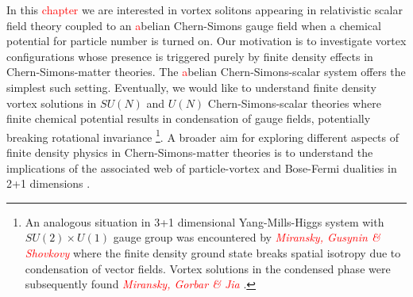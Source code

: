 In this \textcolor{red}{chapter} we are interested in vortex solitons appearing in  relativistic scalar field theory coupled to an \textcolor{red}{a}belian Chern-Simons gauge field when a chemical potential for particle number is turned on. Our motivation is to investigate vortex configurations whose presence is triggered purely by finite density effects in Chern-Simons-matter theories. The \textcolor{red}{a}belian Chern-Simons-scalar system offers the simplest  such setting. Eventually, we would like to understand finite density vortex solutions in $SU(N)$ and $U(N)$ Chern-Simons-scalar theories where  finite chemical potential results in condensation of gauge fields, potentially breaking rotational invariance \cite{Kumar:2018nkf}\footnote{An analogous situation in 3+1 dimensional Yang-Mills-Higgs system with $SU(2)\times U(1)$ gauge group was encountered by \textcolor{red}{\textit{Miransky, Gusynin \& Shovkovy}} \cite{Gusynin:2003yu} where the finite density ground state breaks spatial isotropy due to condensation of vector fields.  Vortex solutions in the condensed phase were subsequently found \textcolor{red}{\textit{Miransky, Gorbar \& Jia}} \cite{Gorbar:2005pi}.}.
A broader aim for exploring different aspects of finite density physics in Chern-Simons-matter theories is to understand the implications of the associated web \cite{Seiberg:2016gmd, Karch:2016sxi, Murugan:2016zal} of particle-vortex and Bose-Fermi dualities in 2+1 dimensions  
\cite{Giombi:2011kc, Aharony:2011jz, Aharony:2012nh, Aharony:2012ns, Jain:2013py, Jain:2013gza, Takimi:2013zca, Aharony:2015mjs, Geracie:2015drf}.

